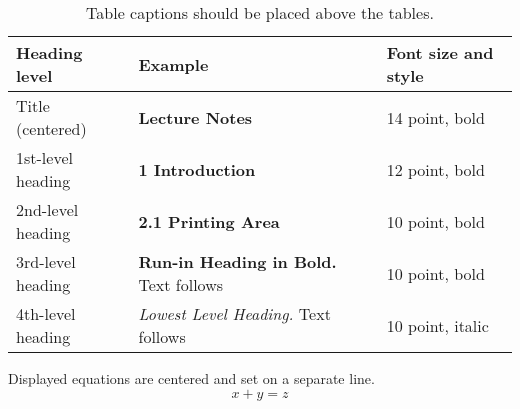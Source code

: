 \documentclass[runningheads]{llncs}
\begin{document}
\begin{table}
\caption{Table captions should be placed above the
tables.}\label{tab1}
\begin{tabular}{|l|l|l|}
\hline
Heading level &  Example & Font size and style\\
\hline
Title (centered) &  {\Large\bfseries Lecture Notes} & 14 point, bold\\
1st-level heading &  {\large\bfseries 1 Introduction} & 12 point, bold\\
2nd-level heading & {\bfseries 2.1 Printing Area} & 10 point, bold\\
3rd-level heading & {\bfseries Run-in Heading in Bold.} Text follows & 10 point, bold\\
4th-level heading & {\itshape Lowest Level Heading.} Text follows & 10 point, italic\\
\hline
\end{tabular}
\end{table}


\noindent Displayed equations are centered and set on a separate
line.
\begin{equation}
x + y = z
\end{equation}

\begin{figure}
\end{figure}
\end{document}
